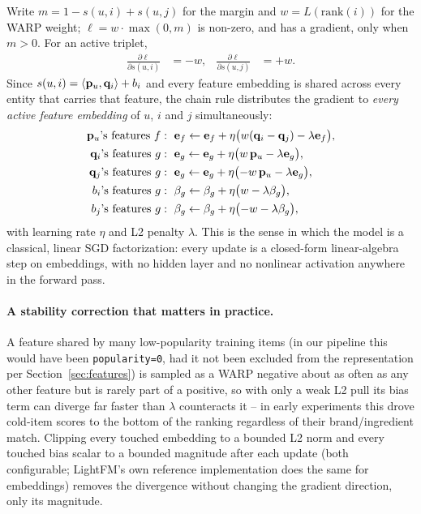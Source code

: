 Write $m = 1 - s(u,i) + s(u,j)$ for the margin and $w = L(\text{rank}(i))$
for the WARP weight; $\ell = w \cdot \max(0, m)$ is non-zero, and has a
gradient, only when $m > 0$. For an active triplet,
\begin{align}
  \frac{\partial \ell}{\partial s(u,i)} &= -w , &
  \frac{\partial \ell}{\partial s(u,j)} &= +w .
\end{align}
Since $s(u,i) = \langle \mathbf{p}_u, \mathbf{q}_i \rangle + b_i$ and every feature
embedding is shared across every entity that carries that feature, the
chain rule distributes the gradient to \emph{every active feature
embedding} of $u$, $i$ and $j$ simultaneously:
\begin{align}
  \mathbf{p}_u \text{'s features } f &:\ \mathbf{e}_f \leftarrow \mathbf{e}_f +
    \eta \big( w (\mathbf{q}_i - \mathbf{q}_j) - \lambda \mathbf{e}_f \big) , \\
  \mathbf{q}_i \text{'s features } g &:\ \mathbf{e}_g \leftarrow \mathbf{e}_g +
    \eta \big( w \, \mathbf{p}_u - \lambda \mathbf{e}_g \big) , \\
  \mathbf{q}_j \text{'s features } g &:\ \mathbf{e}_g \leftarrow \mathbf{e}_g +
    \eta \big( {-w} \, \mathbf{p}_u - \lambda \mathbf{e}_g \big) , \\
  b_i \text{'s features } g &:\ \beta_g \leftarrow \beta_g + \eta \big( w - \lambda \beta_g \big) , \\
  b_j \text{'s features } g &:\ \beta_g \leftarrow \beta_g + \eta \big( {-w} - \lambda \beta_g \big) ,
\end{align}
with learning rate $\eta$ and L2 penalty $\lambda$. This is the sense in
which the model is a classical, linear SGD factorization: every update is a
closed-form linear-algebra step on embeddings, with no hidden layer and no
nonlinear activation anywhere in the forward pass.

\paragraph{A stability correction that matters in practice.} A feature
shared by many low-popularity training items (in our pipeline this would
have been \texttt{popularity=0}, had it not been excluded from the
representation per Section~\ref{sec:features}) is sampled as a WARP
negative about as often as any other feature but is rarely part of a
positive, so with only a weak L2 pull its bias term can diverge far faster
than $\lambda$ counteracts it -- in early experiments this drove cold-item
scores to the bottom of the ranking regardless of their brand/ingredient
match. Clipping every touched embedding to a bounded L2 norm and every
touched bias scalar to a bounded magnitude after each update (both
configurable; LightFM's own reference implementation does the same for
embeddings) removes the divergence without changing the gradient direction,
only its magnitude.


